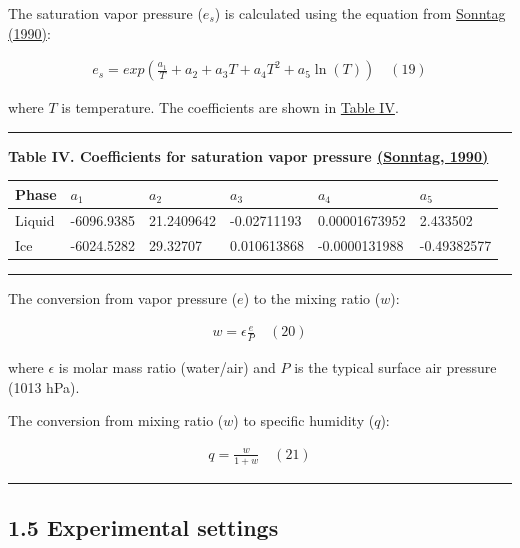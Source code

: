\documentclass[11pt]{article}
\begin{document}
The saturation vapor pressure (\(e_{s}\)) is calculated using the equation from
\hyperref[sonntag1990]{Sonntag (1990)}:

\[
\begin{array}{r}
e_{s} = exp\left( \frac{a_{1}}{T} + a_{2} + a_{3}T + a_{4}T^{2} + a_{5}\ln(T) \right) \quad (19)
\end{array}
\]

where \(T\) is temperature. The coefficients are shown in \hyperref[Table-IV]{Table IV}.

\begin{center}\rule{0.5\linewidth}{0.5pt}\end{center}

\textbf{Table IV. Coefficients for saturation vapor pressure \hyperref[sonntag1990]{(Sonntag,
1990)}}

\begin{longtable}[]{@{}llllll@{}}
\toprule\noalign{}
Phase & \(a_1\) & \(a_2\) & \(a_3\) & \(a_4\) & \(a_5\) \\
\midrule\noalign{}
\endhead
\bottomrule\noalign{}
\endlastfoot
Liquid & -6096.9385 & 21.2409642 & -0.02711193 & 0.00001673952 & 2.433502 \\
Ice & -6024.5282 & 29.32707 & 0.010613868 & -0.0000131988 & -0.49382577 \\
\end{longtable}

\begin{center}\rule{0.5\linewidth}{0.5pt}\end{center}

The conversion from vapor pressure (\(e\)) to the mixing ratio (\(w\)):

\[
\begin{array}{r}
w = \epsilon\frac{e}{P} \quad (20)
\end{array}
\]

where \(\epsilon\) is molar mass ratio (water/air) and \(P\) is the typical surface air pressure
(1013 hPa).

The conversion from mixing ratio (\(w\)) to specific humidity (\(q\)):

\[
\begin{array}{r}
q = \frac{w}{1 + w} \quad (21)
\end{array}
\]

\begin{center}\rule{0.5\linewidth}{0.5pt}\end{center}

\subsection{1.5 Experimental settings}\label{experimental-settings}
\end{document}
